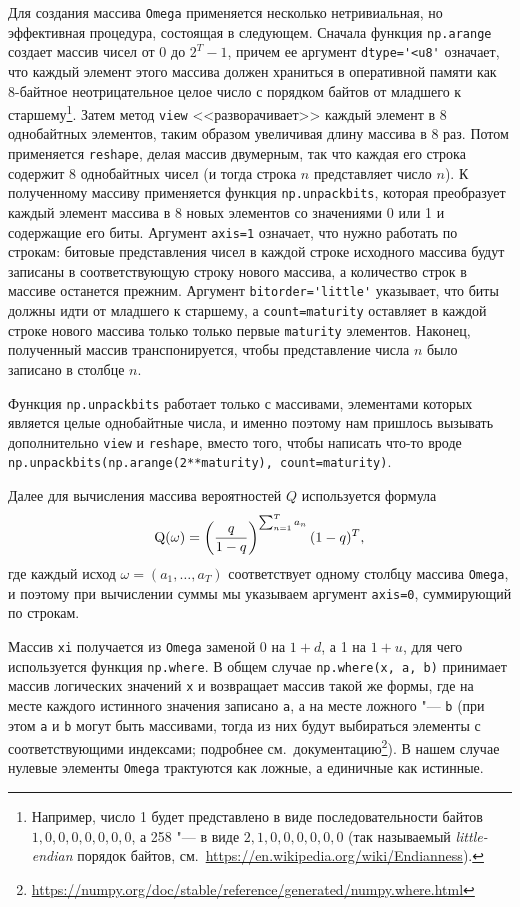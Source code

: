 Для создания массива \verb"Omega" применяется несколько нетривиальная, но эффективная процедура, состоящая в следующем.
Сначала функция \verb"np.arange" создает массив чисел от 0 до $2^T-1$, причем ее аргумент \verb"dtype='<u8'" означает, что каждый элемент этого массива должен храниться в оперативной памяти как 8-байтное неотрицательное целое число с порядком байтов от младшего к старшему\footnote{Например, число 1 будет представлено в виде последовательности байтов $1,0,0,0,0,0,0,0$, а 258 "--- в виде $2,1,0,0,0,0,0,0$ (так называемый \emph{little-endian} порядок байтов, см.\ \url{https://en.wikipedia.org/wiki/Endianness}).}.
Затем метод \verb"view" <<разворачивает>> каждый элемент в 8 однобайтных элементов, таким образом увеличивая длину массива в 8 раз.
Потом применяется \verb"reshape", делая массив двумерным, так что каждая его строка содержит 8 однобайтных чисел (и тогда строка $n$ представляет число $n$).
К полученному массиву применяется функция \verb"np.unpackbits", которая преобразует каждый элемент массива в 8 новых элементов со значениями 0 или 1 и содержащие его биты.
Аргумент \verb"axis=1" означает, что нужно работать по строкам: битовые представления чисел в каждой строке исходного массива будут записаны в соответствующую строку нового массива, а количество строк в массиве останется прежним. 
Аргумент \verb"bitorder='little'" указывает, что биты должны идти от младшего к старшему, а \verb"count=maturity" оставляет в каждой строке нового массива только только первые \verb"maturity" элементов.
Наконец, полученный массив транспонируется, чтобы представление числа $n$ было записано в столбце $n$.

\begin{remark}
Функция \verb"np.unpackbits" работает только с массивами, элементами которых является целые однобайтные числа, и именно поэтому нам пришлось вызывать дополнительно \verb"view" и \verb"reshape", вместо того, чтобы написать что-то вроде \verb"np.unpackbits(np.arange(2**maturity), count=maturity)".
\end{remark}

Далее для вычисления массива вероятностей $Q$ используется формула
\[
\mathrm{Q}(\omega) = \left(\frac q{1-q}\right)^{\sum_{n=1}^T a_n} (1-q)^T,
\]
где каждый исход $\omega=(a_1,\dots,a_T)$ соответствует одному столбцу массива \verb"Omega", и поэтому при вычислении суммы мы указываем аргумент \verb"axis=0", суммирующий по строкам.

Массив \verb"xi" получается из \verb"Omega" заменой 0 на $1+d$, а 1 на $1+u$, для чего используется функция \verb"np.where".
В общем случае \verb"np.where(x, a, b)" принимает массив логических значений \verb"x" и возвращает массив такой же формы, где на месте каждого истинного значения записано \verb"a", а на месте ложного "--- \verb"b" (при этом \verb"a" и \verb"b" могут быть массивами, тогда из них будут выбираться элементы с соответствующими индексами; подробнее см.~документацию\footnote{\url{https://numpy.org/doc/stable/reference/generated/numpy.where.html}}).
В нашем случае нулевые элементы \verb"Omega" трактуются как ложные, а единичные как истинные. 

